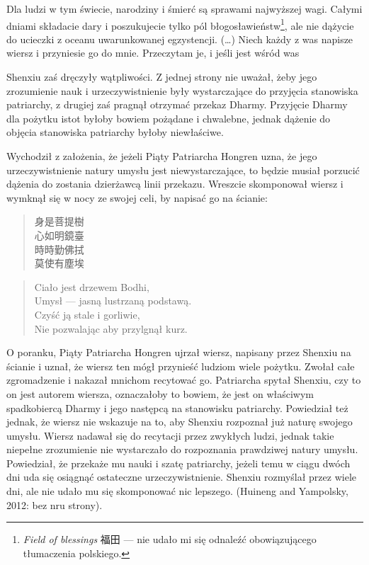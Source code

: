 Dla ludzi w tym świecie, narodziny i śmierć są sprawami najwyższej wagi. Całymi dniami składacie dary i poszukujecie tylko pól błogosławieństw\footnote{\emph{Field of blessings} 福田 --- nie udało mi się odnaleźć obowiązującego tłumaczenia polskiego.}, ale nie dążycie do ucieczki z oceanu uwarunkowanej egzystencji. (\ldots) Niech każdy z was napisze wiersz i przyniesie go do mnie. Przeczytam je, i jeśli jest wśród was 
\fi

Shenxiu zaś dręczyły wątpliwości. Z jednej strony nie uważał, żeby jego zrozumienie nauk i urzeczywistnienie były wystarczające do przyjęcia stanowiska patriarchy, z drugiej zaś pragnął otrzymać przekaz Dharmy. Przyjęcie Dharmy dla pożytku istot byłoby bowiem pożądane i chwalebne, jednak dążenie do objęcia stanowiska patriarchy byłoby niewłaściwe.

Wychodził z założenia, że jeżeli Piąty Patriarcha Hongren uzna, że jego urzeczywistnienie natury umysłu jest niewystarczające, to będzie musiał porzucić dążenia do zostania dzierżawcą linii przekazu. Wreszcie skomponował wiersz i wymknął się w nocy ze swojej celi, by napisać go na ścianie:

\vspace*{9pt}
\begin{minipage}[t]{0.4\textwidth}
\begin{verse}
身是菩提樹\\
心如明鏡臺\\
時時勤佛拭\\
莫使有塵埃
\end{verse}
\end{minipage}
\begin{minipage}[t]{0.6\textwidth}
\itshape
\begin{verse}
Ciało jest drzewem Bodhi,\\
Umysł --- jasną lustrzaną podstawą.\\
Czyść ją stale i gorliwie,\\
Nie pozwalając aby przylgnął kurz. 
\end{verse}
\end{minipage}
\vspace*{9pt}

O poranku, Piąty Patriarcha Hongren ujrzał wiersz, napisany przez Shenxiu na ścianie i uznał, że wiersz ten mógł przynieść ludziom wiele pożytku. Zwołał całe zgromadzenie i nakazał mnichom recytować go. Patriarcha spytał Shenxiu, czy to on jest autorem wiersza, oznaczałoby to bowiem, że jest on właściwym spadkobiercą Dharmy i jego następcą na stanowisku patriarchy. Powiedział też jednak, że wiersz nie wskazuje na to, aby Shenxiu rozpoznał już naturę swojego umysłu. Wiersz nadawał się do recytacji przez zwykłych ludzi, jednak takie niepełne zrozumienie nie wystarczało do rozpoznania prawdziwej natury umysłu. Powiedział, że przekaże mu nauki i szatę patriarchy, jeżeli temu w ciągu dwóch dni uda się osiągnąć ostateczne urzeczywistnienie. Shenxiu rozmyślał przez wiele dni, ale nie udało mu się skomponować nic lepszego. (Huineng and Yampolsky, 2012: bez nru strony).

